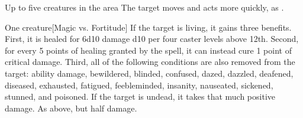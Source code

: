 \begin{spellheader}
\end{spellheader}
\begin{spelleffects}
    \begin{spelltargets}{Up to five creatures in the area}
        \spelleffect The target moves and acts more quickly, as .
    \end{spelltargets}
\end{spelleffects}
\begin{spellfooter}
    
\end{spellfooter}

\begin{spellheader}
    \spellrng{\rngclose}
\end{spellheader}
\begin{spelleffects}
    \begin{spelltarget}{One creature}[Magic vs. Fortitude]
        \spelleffect If the target is living, it gains three benefits. First, it is healed for 6d10 damage \add d10 per four caster levels above 12th. Second, for every 5 points of healing granted by the spell, it can instead cure 1 point of critical damage. Third, all of the following conditions are also removed from the target: ability damage, bewildered, blinded, confused, dazed, dazzled, deafened, diseased, exhausted, fatigued, feebleminded, insanity, nauseated, sickened, stunned, and poisoned.
        \spellsuccess If the target is undead, it takes that much positive damage.
        \spellfailure As above, but half damage.
    \end{spelltarget}
\end{spelleffects}
\begin{spellfooter}
    
\end{spellfooter}

